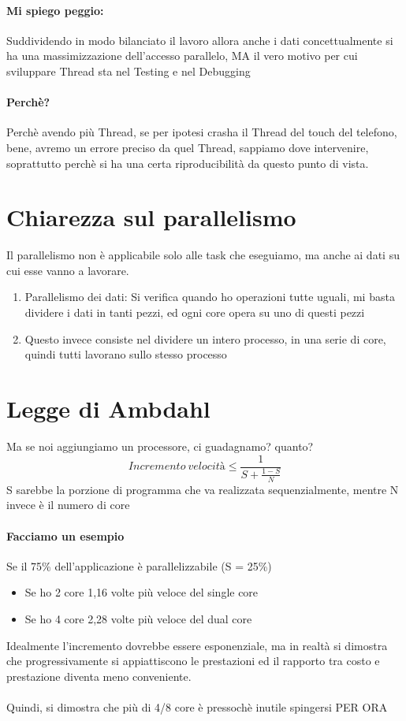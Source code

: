 \documentclass[12pt, a4paper, openany, twoside]{book}
\begin{document}
\paragraph{Mi spiego peggio: }Suddividendo in modo bilanciato il lavoro allora 
anche i dati concettualmente si ha una massimizzazione dell'accesso parallelo,
MA il vero motivo per cui sviluppare Thread sta nel Testing e nel Debugging
\paragraph{Perchè? }Perchè avendo più Thread, se per ipotesi crasha il Thread
del touch del telefono, bene, avremo un errore preciso da quel Thread, sappiamo
dove intervenire, soprattutto perchè si ha una certa riproducibilità da questo
punto di vista.
\section{Chiarezza sul parallelismo}
Il parallelismo non è applicabile solo alle task che eseguiamo, ma anche ai dati
su cui esse vanno a lavorare.
\begin{enumerate}
	\item Parallelismo dei dati: Si verifica quando ho operazioni tutte uguali,
	mi basta dividere i dati in tanti pezzi, ed ogni core opera su uno di questi
	pezzi
	\item Questo invece consiste nel dividere un intero processo, in una serie
	di core, quindi tutti lavorano sullo stesso processo
\end{enumerate}
\section{Legge di Ambdahl}
Ma se noi aggiungiamo un processore, ci guadagnamo? quanto?
\[
Incremento~velocità\leq \frac{1}{S+\frac{1-S}{N}}
\]
S sarebbe la porzione di programma che va realizzata sequenzialmente, mentre
N invece è il numero di core
\paragraph{Facciamo un esempio} Se il 75\% dell'applicazione è parallelizzabile
(S = 25\%)
\begin{itemize}
	\item Se ho 2 core 1,16 volte più veloce del single core
	\item Se ho 4 core 2,28 volte più veloce del dual core
\end{itemize}
Idealmente l'incremento dovrebbe essere esponenziale, ma in realtà si dimostra
che progressivamente si appiattiscono le prestazioni ed il rapporto tra costo
e prestazione diventa meno conveniente.\\ \\
Quindi, si dimostra che più di 4/8 core è pressochè inutile spingersi PER ORA
\end{document}
